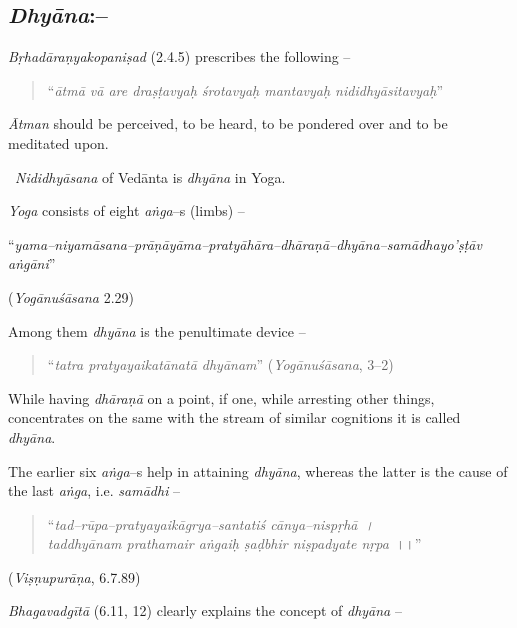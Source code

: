 \subsection*{\textit{Dhyāna}:–}

\textit{Bṛhadāraṇyakopaniṣad} (2.4.5) prescribes the following –

\begin{verse}
“\textit{ātmā vā are draṣṭavyaḥ śrotavyaḥ mantavyaḥ nididhyāsitavyaḥ}”
\end{verse}

\textit{Ātman} should be perceived, to be heard, to be pondered over and to be meditated upon.

 \textit{Nididhyāsana} of Vedānta is \textit{dhyāna} in Yoga.

\textit{Yoga} consists of eight \textit{aṅga}–s (limbs) –

\begin{myquote}
“\textit{yama–niyamāsana–prāṇāyāma–pratyāhāra–dhāraṇā–dhyāna–samādhayo’ṣṭāv aṅgāni}”
\end{myquote}

\begin{flushright}
(\textit{Yogānuśāsana} 2.29)
\end{flushright}

Among them \textit{dhyāna} is the penultimate device –

\begin{verse}
“\textit{tatra pratyayaikatānatā dhyānam}” (\textit{Yogānuśāsana}, 3–2)
\end{verse}

While having \textit{dhāraṇā} on a point, if one, while arresting other things, concentrates on the same with the stream of similar cognitions it is called \textit{dhyāna}.

The earlier six \textit{aṅga}–s help in attaining \textit{dhyāna}, whereas the latter is the cause of the last \textit{aṅga}, i.e. \textit{samādhi} –

\begin{verse}
“\textit{tad–rūpa–pratyayaikāgrya–santatiś cānya–nispṛhā~।}\\\textit{taddhyānam prathamair aṅgaiḥ ṣaḍbhir niṣpadyate nṛpa}~।।”
\end{verse}

\begin{flushright}
(\textit{Viṣṇupurāṇa}, 6.7.89)
\end{flushright}

\textit{Bhagavadgītā} (6.11, 12) clearly explains the concept of \textit{dhyāna} –

